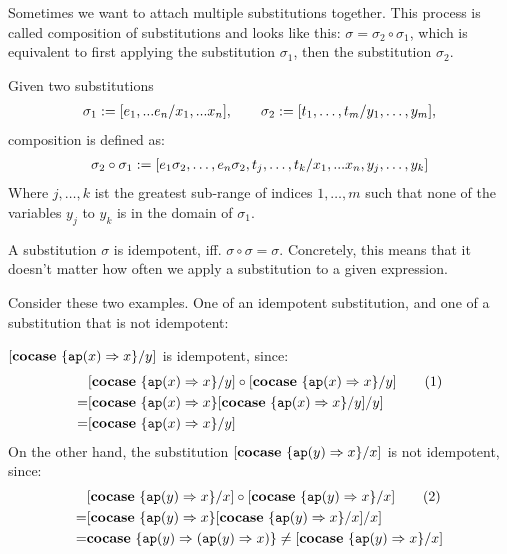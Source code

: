 \documentclass[twoside,12pt,a4paper]{article}
\begin{document}
Sometimes we want to attach multiple substitutions together.
This process is called composition of substitutions and looks like this: $\sigma = \sigma_2 \circ \sigma_1$, which is equivalent to first applying the substitution $\sigma_1$, then the substitution $\sigma_2$.

\begin{definition}
    Given two substitutions
    \begin{align*}
        \sigma_1 := [e_1,...e_n/x_1,...x_n],\qquad \sigma_2 := [t_1,\dots,t_m/y_1,\dots,y_m],
    \end{align*}
    composition is defined as:
    \begin{align*}
        \sigma_2\circ\sigma_1 := [e_1\sigma_2,\dots,e_n\sigma_2,t_j,\dots,t_k/x_1,...x_n,y_j,\dots,y_k]
    \end{align*}
    Where $j, \dots, k$ ist the greatest sub-range of indices $1,\dots,m$ such that none of the variables $y_j$ to $y_k$ is in the domain of $\sigma_1$. 
\end{definition}

\begin{definition}[Idempotency]
    A substitution $\sigma$ is idempotent, iff. $\sigma \circ \sigma = \sigma$.
    Concretely, this means that it doesn't matter how often we apply a substitution to a given expression.
\end{definition}

Consider these two examples. One of an idempotent substitution, and one of a substitution that is not idempotent:
\begin{example}[Idempotency]
    $[\textbf{cocase}\ \{\texttt{ap}(x)\Rightarrow x\} / y]$ is idempotent, since:
    \begin{align*}
        &[\textbf{cocase}\ \{\texttt{ap}(x)\Rightarrow x\} / y] \circ [\textbf{cocase}\ \{\texttt{ap}(x)\Rightarrow x\} / y] \tag{1}\\
        =& [\textbf{cocase}\ \{\texttt{ap}(x)\Rightarrow x\}[\textbf{cocase}\ \{\texttt{ap}(x)\Rightarrow x\} / y] / y] \\
        =& [\textbf{cocase}\ \{\texttt{ap}(x)\Rightarrow x\} / y] 
    \end{align*}
On the other hand, the substitution $[\textbf{cocase}\ \{\texttt{ap}(y)\Rightarrow x\} / x]$ is not idempotent, since:
\begin{align*}
    &[\textbf{cocase}\ \{\texttt{ap}(y)\Rightarrow x\} / x] \circ [\textbf{cocase}\ \{\texttt{ap}(y)\Rightarrow x\} / x]\tag{2}\\ 
    =& [\textbf{cocase}\ \{\texttt{ap}(y)\Rightarrow x\}[\textbf{cocase}\ \{\texttt{ap}(y)\Rightarrow x\} / x] / x] \\
    =& \textbf{cocase}\ \{\texttt{ap}(y)\Rightarrow (\texttt{ap}(y)\Rightarrow x) \} \neq [\textbf{cocase}\ \{\texttt{ap}(y)\Rightarrow x\} / x]
\end{align*}
\end{example}
\end{document}
